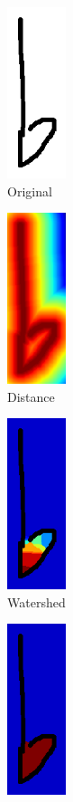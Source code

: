 \begin{figure}[H]
    \centering
    \begin{subfigure}[b]{.19\linewidth}
        \centering
        \includegraphics[height=5cm]{gfx/techniques/scoring/flats/6193-original.png}
        \caption{Original}
        \label{fig:flat-broken}
    \end{subfigure}
    \begin{subfigure}[b]{.19\linewidth}
        \centering
        \includegraphics[height=5cm]{gfx/techniques/scoring/flats/6193-distance.png}
        \caption{Distance}
    \end{subfigure}
    \begin{subfigure}[b]{.19\linewidth}
        \centering
        \includegraphics[height=5cm]{gfx/techniques/scoring/flats/6193-watershed.png}
        \caption{Watershed}
        \label{fig:flat-broken-watershed}
    \end{subfigure}
    \begin{subfigure}[b]{.19\linewidth}
        \centering
        \includegraphics[height=5cm]{gfx/techniques/scoring/flats/6193-segmented.png}

\end{subfigure}
\end{figure}
